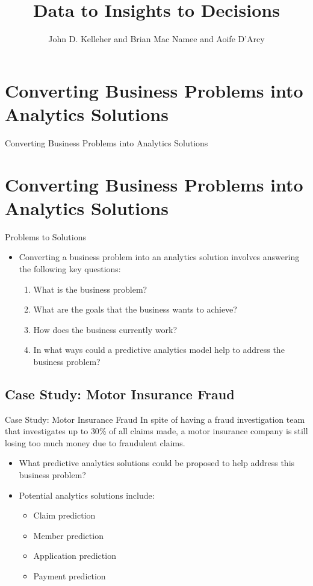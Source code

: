 \documentclass[xcolor={table}]{beamer}
\title{Data to Insights to Decisions}
\author{John D. Kelleher and Brian Mac Namee and Aoife D'Arcy}
\institute{}
\date{}
\newcommand{\SectionSlideShortHeader}[3][]{
	\ifthenelse{\isempty{#1}}
		{\section[#3]{#2}\begin{frame} \begin{center}\begin{huge}#2\end{huge}\end{center}\end{frame}}
		{\section[#1]{#2}\begin{frame} \begin{center}\begin{huge}#3\end{huge}\end{center}\end{frame}}
}
\begin{document}
\begin{frame}
	\titlepage
\end{frame}
\begin{frame}
	 \tableofcontents
\end{frame}

\SectionSlideShortHeader{Converting Business Problems into Analytics Solutions}{Problems to Solutions}

\begin{frame}
\begin{itemize}
\item Converting a business problem into an analytics solution involves answering the following key questions:
\begin{enumerate}
\item What is the business problem?
\item What are the goals that the business wants to achieve?
\item How does the business currently work?
\item In what ways could a predictive analytics model help to address the business problem?
\end{enumerate}
\end{itemize}
\end{frame}

\subsection{Case Study: Motor Insurance Fraud}


\begin{frame}
\begin{block}{Case Study: Motor Insurance Fraud}
In spite of having a fraud investigation team that investigates up to $30$\% of all claims made, a  motor insurance company is still losing too much money due to fraudulent claims. 
\end{block}
\begin{itemize}
	\item What predictive analytics solutions could be proposed to help address this business problem?
\end{itemize}
\end{frame}

\begin{frame}
\begin{itemize}
	\item Potential analytics solutions include:
\begin{itemize}
	\item Claim prediction 
	\item Member prediction
	\item Application prediction
	\item Payment prediction 
\end{itemize}
\end{itemize}
\end{frame}
\end{document}
